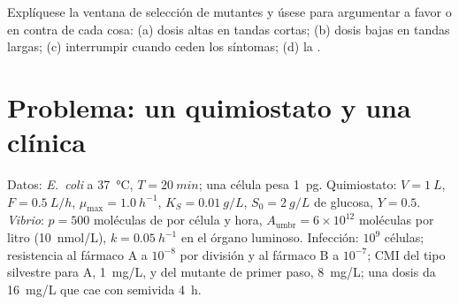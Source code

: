 \begin{exercise}[$\star\star\star$]\label{exo:b3:bacteriology:12}
Explíquese la ventana de selección de mutantes y úsese para argumentar a
favor o en contra de cada cosa: (a) dosis altas en tandas cortas;
(b) dosis bajas en tandas largas; (c) interrumpir cuando ceden los
síntomas; (d) la .
\end{exercise}

\section{Problema: un quimiostato y una clínica}

\begin{problem}
\label{pb:b3:bacteriology:1}
Datos: \emph{E.~coli} a \qty{37}{\celsius}, $T = \qty{20}{min}$; una
célula pesa \qty{1}{pg}. Quimiostato: $V = \qty{1}{L}$,
$F = \qty{0.5}{L/h}$, $\mu_{\max} = \qty{1.0}{h^{-1}}$,
$K_{S} = \qty{0.01}{g/L}$, $S_{0} =
\qty{2}{g/L}$ de glucosa, $Y = 0.5$. \emph{Vibrio}: $p = 500$ moléculas
de  por célula y hora, $A_{\text{umbr}} = 6\times 10^{12}$
moléculas por litro (\qty{10}{nmol/L}), $k = \qty{0.05}{h^{-1}}$ en el
órgano luminoso. Infección: $10^{9}$ células; resistencia al fármaco A a
$10^{-8}$ por división y al fármaco B a $10^{-7}$; CMI del tipo silvestre
para A, \qty{1}{mg/L}, y del mutante de primer paso, \qty{8}{mg/L}; una
dosis da \qty{16}{mg/L} que cae con semivida \qty{4}{h}.


\end{problem}
